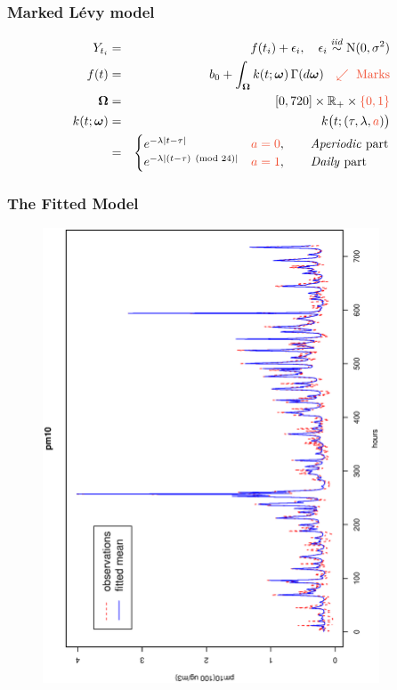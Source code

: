 \documentclass[dvips]{beamer}
\newcommand{\bs}[2]{\begin{frame} \frametitle{#1} 
{#2}
\end{frame} }
\newcommand{\red}{\textcolor{RedOrange}}
\begin{document}
\bs{Marked L\'evy model}{
\begin{eqnarray*}
    Y_{t_i} &=& f(t_i) + \epsilon_i, %
                                      \quad \epsilon_i \iid \N(0, \sigma^2)\\
        f(t) &=& b_0 +   \int_{\bfOmega} k(t;\bfomega)\,\Gamma(d\bfomega)\quad
                                     \red{\swarrow~\textrm{Marks}}\\
      \bfOmega &=& [0,720] \times \bbR_+\times \red{\{0,1\}}\\
   k(t;\bfomega) &=&  k\big(t;(\tau,\lambda,\red a)\big)\\
               &=&  \begin{cases}
                     e^{-\lambda |t-\tau|}&\red{a=0},
                       \textrm{\qquad \textit{Aperiodic} part}\\
                     e^{-\lambda |(t-\tau)\pmod{24}|}&\red{a=1},
                       \textrm{\qquad \textit{Daily} part}
                    \end{cases}
\end{eqnarray*}
}


\bs{The Fitted Model} {
\begin{figure}[!h]
  \begin{center}
    \includegraphics[angle=270,origin=l,totalheight=6truecm,
     clip=1,width=10cm]{30daypm10fitted.ps}
  \end{center}
\end{figure}
}
\end{document}
